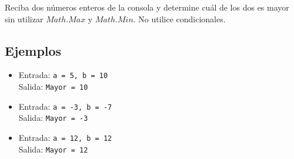 Reciba dos números enteros de la consola y determine cuál de los dos es mayor sin utilizar $Math.Max$ y $Math.Min$. No utilice condicionales.
\subsection*{Ejemplos}
\begin{itemize}
\item Entrada: \texttt{a = 5, b = 10}\\
      Salida: \texttt{Mayor = 10}
\item Entrada: \texttt{a = -3, b = -7}\\
      Salida: \texttt{Mayor = -3}
\item Entrada: \texttt{a = 12, b = 12}\\
      Salida: \texttt{Mayor = 12}
\end{itemize}